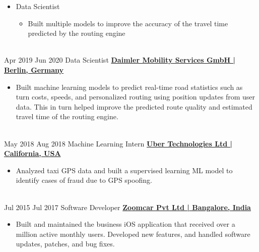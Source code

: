 \documentclass[letterpaper]{DS_class_file} %
\begin{document}
\begin{twenty}
{\begin{itemize}
\begin{itemize}
            \end{itemize}
        \item Data Scientist
            \begin{itemize}
             \item Built multiple models to improve the accuracy of the travel time predicted by the routing engine
            \end{itemize}
		\end{itemize}}
		\\
	\twentyitem
		{Apr 2019}
		{Jun 2020}
		{\hspace{0.3cm}Data Scientist}
		{\href{https://www.mercedes-benz-mobility.com/en/}{\textbf{Daimler Mobility Services GmbH | Berlin, Germany}}}
		{}
		{\begin{itemize}
			\item Built machine learning models to predict real-time road statistics such as turn costs, speeds, and personalized routing using position updates from user data. This in turn helped improve the predicted route quality and estimated travel time of the routing engine.
		\end{itemize}}
		\\
	\twentyitem
		{May 2018}
		{Aug 2018}
		{\hspace{0.3cm}Machine Learning Intern}
		{\href{https://www.uber.com/}{\textbf{Uber Technologies Ltd | California, USA}}}
		{}
		{\begin{itemize}
			\item Analyzed taxi GPS data and built a supervised learning ML model to identify cases of fraud due to GPS spoofing.
		\end{itemize}}
		\\
	\twentyitem
		{Jul 2015}
		{Jul 2017}
		{\hspace{0.3cm}Software Developer}
		{\href{http://www.organonanalytics.com/pages/index.php}{\textbf{Zoomcar Pvt Ltd | Bangalore, India}}}
		{}
		{\begin{itemize}
			\item Built and maintained the business iOS application that received over a million active monthly users. Developed new features, and handled software updates, patches, and bug fixes.
		\end{itemize}}
		\\
\end{twenty}
\end{document}
